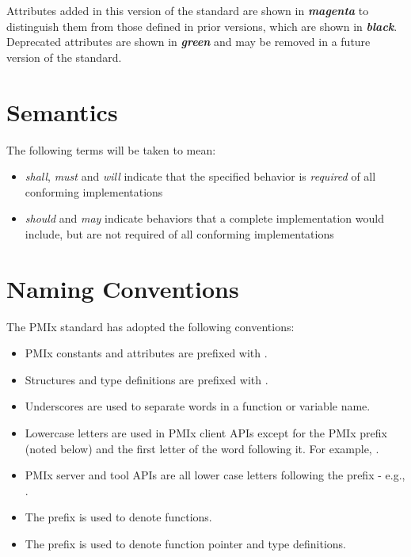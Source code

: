 Attributes added in this version of the standard are shown in \textit{\textbf{\color{magenta}magenta}} to distinguish them from those defined in prior versions, which are shown in \textit{\textbf{black}}. Deprecated attributes are shown in \textit{\textbf{\color{green!80!black}green}} and may be removed in a future version of the standard.

\section{Semantics}

The following terms will be taken to mean:

\begin{itemize}
\item \emph{shall}, \emph{must} and \emph{will} indicate that the specified behavior is \emph{required} of all conforming implementations
\item \emph{should} and \emph{may} indicate behaviors that a complete implementation would include, but are not required of all conforming implementations
\end{itemize}

\section{Naming Conventions}

The \ac{PMIx} standard has adopted the following conventions:

\begin{itemize}
\item \ac{PMIx} constants and attributes are prefixed with \textbf{}.
\item Structures and type definitions are prefixed with .
\item Underscores are used to separate words in a function or variable name.
\item Lowercase letters are used in \ac{PMIx} client \acp{API} except for the \ac{PMIx} prefix (noted below) and the first letter of the word following it.
For example, .
\item \ac{PMIx} server and tool \acp{API} are all lower case letters following the prefix - e.g., .
\item The  prefix is used to denote functions.
\item The  prefix is used to denote function pointer and type definitions.
\end{itemize}

